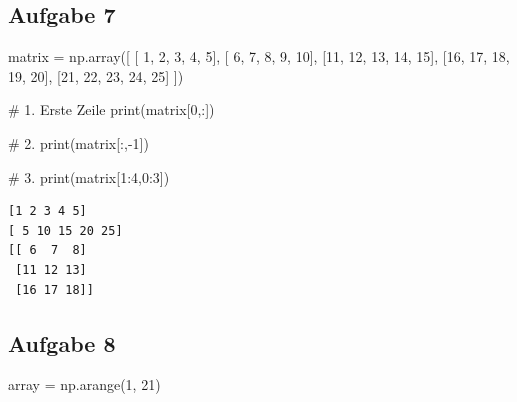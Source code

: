 \documentclass[
  letterpaper,
  DIV=11,
  numbers=noendperiod]{scrreprt}
\newenvironment{Shaded}{\begin{snugshade}}{\end{snugshade}}
\newcommand{\BuiltInTok}[1]{\textcolor[rgb]{0.00,0.23,0.31}{#1}}
\newcommand{\CommentTok}[1]{\textcolor[rgb]{0.37,0.37,0.37}{#1}}
\newcommand{\DecValTok}[1]{\textcolor[rgb]{0.68,0.00,0.00}{#1}}
\newcommand{\NormalTok}[1]{\textcolor[rgb]{0.00,0.23,0.31}{#1}}
\newcommand{\OperatorTok}[1]{\textcolor[rgb]{0.37,0.37,0.37}{#1}}
\begin{document}
\begin{tcolorbox}
\subsection*{Aufgabe 7}\label{aufgabe-7-1}

\begin{Shaded}
\begin{Highlighting}[]
\NormalTok{matrix }\OperatorTok{=}\NormalTok{ np.array([}
\NormalTok{    [ }\DecValTok{1}\NormalTok{,  }\DecValTok{2}\NormalTok{,  }\DecValTok{3}\NormalTok{,  }\DecValTok{4}\NormalTok{,  }\DecValTok{5}\NormalTok{],}
\NormalTok{    [ }\DecValTok{6}\NormalTok{,  }\DecValTok{7}\NormalTok{,  }\DecValTok{8}\NormalTok{,  }\DecValTok{9}\NormalTok{, }\DecValTok{10}\NormalTok{],}
\NormalTok{    [}\DecValTok{11}\NormalTok{, }\DecValTok{12}\NormalTok{, }\DecValTok{13}\NormalTok{, }\DecValTok{14}\NormalTok{, }\DecValTok{15}\NormalTok{],}
\NormalTok{    [}\DecValTok{16}\NormalTok{, }\DecValTok{17}\NormalTok{, }\DecValTok{18}\NormalTok{, }\DecValTok{19}\NormalTok{, }\DecValTok{20}\NormalTok{],}
\NormalTok{    [}\DecValTok{21}\NormalTok{, }\DecValTok{22}\NormalTok{, }\DecValTok{23}\NormalTok{, }\DecValTok{24}\NormalTok{, }\DecValTok{25}\NormalTok{]}
\NormalTok{])}

\CommentTok{\# 1. Erste Zeile}
\BuiltInTok{print}\NormalTok{(matrix[}\DecValTok{0}\NormalTok{,:])}

\CommentTok{\# 2.}
\BuiltInTok{print}\NormalTok{(matrix[:,}\OperatorTok{{-}}\DecValTok{1}\NormalTok{])}

\CommentTok{\# 3.}
\BuiltInTok{print}\NormalTok{(matrix[}\DecValTok{1}\NormalTok{:}\DecValTok{4}\NormalTok{,}\DecValTok{0}\NormalTok{:}\DecValTok{3}\NormalTok{])}
\end{Highlighting}
\end{Shaded}

\begin{verbatim}
[1 2 3 4 5]
[ 5 10 15 20 25]
[[ 6  7  8]
 [11 12 13]
 [16 17 18]]
\end{verbatim}

\subsection*{Aufgabe 8}\label{aufgabe-8-1}

\begin{Shaded}
\begin{Highlighting}[]
\NormalTok{array }\OperatorTok{=}\NormalTok{ np.arange(}\DecValTok{1}\NormalTok{, }\DecValTok{21}\NormalTok{)}


\end{Highlighting}
\end{Shaded}
\end{tcolorbox}
\end{document}
